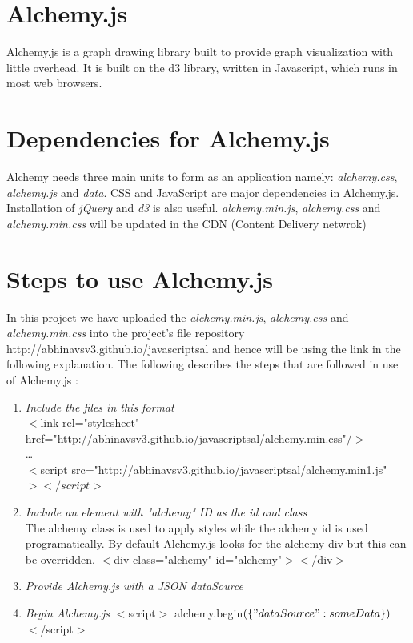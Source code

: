\section{Alchemy.js}

Alchemy.js is a graph drawing library built to provide graph visualization with little overhead. It is built on the d3 library, written in Javascript, which runs in most web browsers.   

\section{Dependencies for Alchemy.js}
Alchemy needs three main units to  form as an application namely:  \textit{alchemy.css}, \textit{alchemy.js} and \textit{data}. CSS and JavaScript are major dependencies in Alchemy.js. Installation of \textit{jQuery} and \textit{d3} is also useful. \textit{alchemy.min.js}, \textit{alchemy.css} and \textit{alchemy.min.css } will be updated in the CDN (Content Delivery netwrok)
\section{Steps to use Alchemy.js}
 In this project we have uploaded the \textit{alchemy.min.js}, \textit{alchemy.css} and \textit{alchemy.min.css } into the project's file repository http://abhinavsv3.github.io/javascriptsal and hence will be using the link in the following explanation. 
The following describes the steps that are followed in use of Alchemy.js :
\begin{enumerate}

\item \textit{Include the files in this format}\\
$<$link rel="stylesheet" href="http://abhinavsv3.github.io/javascriptsal/alchemy.min.css"/$>$
\\
\ldots\\
$<$script src="http://abhinavsv3.github.io/javascriptsal/alchemy.min1.js"$></script>$

\item \textit{Include an element with "alchemy" ID as the id and class }\\
The alchemy class is used to apply styles while the alchemy id is used programatically. By default Alchemy.js looks for the alchemy div but this can be overridden.
$<$div class="alchemy" id="alchemy"$><$/div$>$

\item \textit{Provide Alchemy.js with a JSON dataSource}

\item \textit{Begin Alchemy.js}
$<$script$>$
  alchemy.begin$(\{"dataSource": someData\})$
$<$/script$>$



\end{enumerate}
